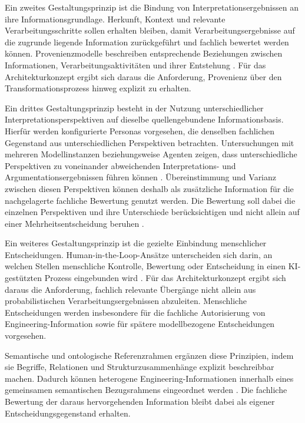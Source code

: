 Ein zweites Gestaltungsprinzip ist die Bindung von
Interpretationsergebnissen an ihre Informationsgrundlage. Herkunft, Kontext
und relevante Verarbeitungsschritte sollen erhalten bleiben, damit
Verarbeitungsergebnisse auf die zugrunde liegende Information zurückgeführt
und fachlich bewertet werden können. Provenienzmodelle beschreiben
entsprechende Beziehungen zwischen Informationen, Verarbeitungsaktivitäten
und ihrer Entstehung \cite{MoreauMissier2013,Simmhan2005}. Für das
Architekturkonzept ergibt sich daraus die Anforderung, Provenienz über den
Transformationsprozess hinweg explizit zu erhalten.

Ein drittes Gestaltungsprinzip besteht in der Nutzung unterschiedlicher
Interpretationsperspektiven auf dieselbe quellengebundene Informationsbasis.
Hierfür werden konfigurierte Personas vorgesehen, die denselben fachlichen
Gegenstand aus unterschiedlichen Perspektiven betrachten. Untersuchungen mit
mehreren Modellinstanzen beziehungsweise Agenten zeigen, dass unterschiedliche
Perspektiven zu voneinander abweichenden Interpretations- und
Argumentationsergebnissen führen können \cite{Du2024,TriemDing2024}.
Übereinstimmung und Varianz zwischen diesen Perspektiven können deshalb als
zusätzliche Information für die nachgelagerte fachliche Bewertung genutzt
werden. Die Bewertung soll dabei die einzelnen Perspektiven und ihre
Unterschiede berücksichtigen und nicht allein auf einer Mehrheitsentscheidung
beruhen \cite{Sunkaraneni2026}.

Ein weiteres Gestaltungsprinzip ist die gezielte Einbindung menschlicher
Entscheidungen. Human-in-the-Loop-Ansätze unterscheiden sich darin, an welchen
Stellen menschliche Kontrolle, Bewertung oder Entscheidung in einen
KI-gestützten Prozess eingebunden wird
\cite{MosqueiraRey2023,Lazaros2026}. Für das Architekturkonzept ergibt sich
daraus die Anforderung, fachlich relevante Übergänge nicht allein aus
probabilistischen Verarbeitungsergebnissen abzuleiten. Menschliche
Entscheidungen werden insbesondere für die fachliche Autorisierung von
Engineering-Information sowie für spätere modellbezogene Entscheidungen
vorgesehen.

Semantische und ontologische Referenzrahmen ergänzen diese Prinzipien, indem
sie Begriffe, Relationen und Strukturzusammenhänge explizit beschreibbar
machen. Dadurch können heterogene Engineering-Informationen innerhalb eines
gemeinsamen semantischen Bezugsrahmens eingeordnet werden
\cite{ISO21838_2_2021,OrellanaMandrick2019,Lu2022,Kulvatunyou2022}. Die
fachliche Bewertung der daraus hervorgehenden Information bleibt dabei als
eigener Entscheidungsgegenstand erhalten.

